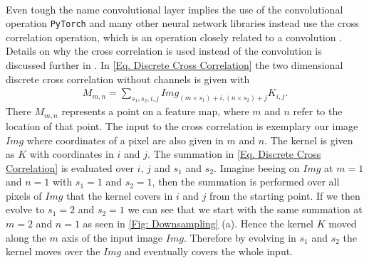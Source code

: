 \\Even tough the name convolutional layer implies the use of the convolutional operation \texttt{PyTorch} and many other neural network libraries instead use the cross correlation operation, which is an operation closely related to a convolution \cite{Goodfellow} \cite{Pytorch website}. Details on why the cross correlation is used instead of the convolution is discussed further in \cite{Goodfellow}. In \cref{Eq. Discrete Cross Correlation} the two dimensional discrete cross correlation without channels is given with
\begin{align}
M_{m,n} = \sum_{s_1,s_2,i,j}Img_{(m\times s_1)+i,(n\times s_2)+j}K_{i,j}\mathrm{.}
\label{Eq. Discrete Cross Correlation}
\end{align}
There $M_{m,n}$ represents a point on a feature map, where $m$ and $n$ refer to the location of that point. The input to the cross correlation is exemplary our image $Img$ where coordinates of a pixel are also given in $m$ and $n$. The kernel is given as $K$ with coordinates in $i$ and $j$. The summation in \cref{Eq. Discrete Cross Correlation} is evaluated over $i$, $j$ and $s_1$ and $s_2$. Imagine beeing on $Img$ at $m=1$ and $n=1$ with $s_1=1$ and $s_2=1$, then the summation is performed over all pixels of $Img$ that the kernel covers in $i$ and $j$ from the starting point. If we then evolve to $s_1=2$ and $s_2=1$ we can see that we start with the same summation at $m=2$ and $n=1$ as seen in \cref{Fig: Downsampling} (a). Hence the kernel $K$ moved along the $m$ axis of the input image $Img$. Therefore by evolving in $s_1$ and $s_2$ the kernel moves over the $Img$ and eventually covers the whole input.
